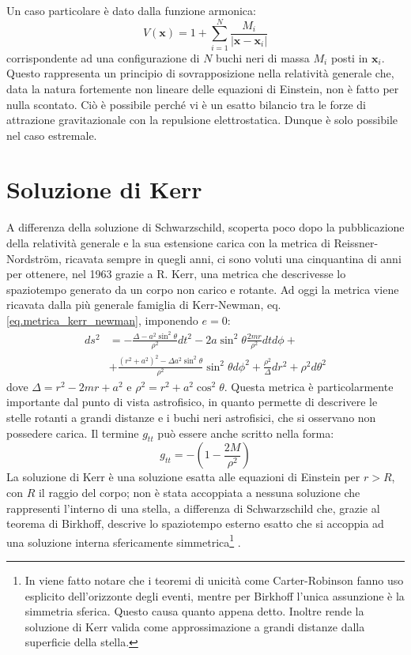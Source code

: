Un caso particolare è dato dalla funzione armonica:
\begin{equation*}
    V(\bm{x}) = 1 + \sum_{i=1}^N \frac{M_i}{|\bm{x} - \bm{x}_i|}
\end{equation*}
corrispondente ad una configurazione di $N$ buchi neri di massa $M_i$ posti in $\bm{x}_i$.
Questo rappresenta un principio di sovrapposizione nella relatività generale che, data la natura fortemente non lineare delle equazioni di Einstein, non è fatto per nulla scontato. Ciò è possibile perché vi è un esatto bilancio tra le forze di attrazione gravitazionale con la repulsione elettrostatica. Dunque è solo possibile nel caso estremale.

\section{Soluzione di Kerr}
A differenza della soluzione di Schwarzschild, scoperta poco dopo la pubblicazione della relatività generale e la sua estensione carica con la metrica di Reissner-Nordstr\"om, ricavata sempre in quegli anni, ci sono voluti una cinquantina di anni per ottenere, nel 1963 grazie a R. Kerr, una metrica che descrivesse lo spaziotempo generato da un corpo non carico e rotante.
Ad oggi la metrica viene ricavata dalla più generale famiglia di Kerr-Newman, eq. \ref{eq.metrica_kerr_newman}, imponendo $e = 0$:
\begin{align}
ds^2 &= - \frac{\Delta - a^2\sin^2\theta}{\rho^2}dt^2 - 2a\sin^2\theta\frac{2mr}{\rho^2}dtd\phi + \nonumber \\
&+ \frac{(r^2 + a^2)^2- \Delta a^2\sin^2\theta}{\rho^2}\sin^2\theta d\phi^2 + \frac{\rho^2}{\Delta}dr^2 + \rho^2 d\theta^2
    \label{eq.metrica_kerr}
\end{align}
dove $\Delta = r^2 -2mr + a^2$ e $\rho^2 = r^2 + a^2\cos^2\theta$. Questa metrica è particolarmente importante dal punto di vista astrofisico, in quanto permette di descrivere le stelle rotanti a grandi distanze e i buchi neri astrofisici, che si osservano non possedere carica.  Il termine $g_{tt}$ può essere anche scritto nella forma:
\begin{equation*}
    g_{tt}= -\left( 1 - \frac{2M}{\rho^2}\right)
\end{equation*}
La soluzione di Kerr è una soluzione esatta alle equazioni di Einstein per $r > R$, con $R$ il raggio del corpo; non è stata accoppiata a nessuna soluzione che rappresenti l'interno di una stella, a differenza di Schwarzschild che, grazie al teorema di Birkhoff, descrive lo spaziotempo esterno esatto che si accoppia ad una soluzione interna sfericamente simmetrica\footnote{In \cite{tong} viene fatto notare che i teoremi di unicità come Carter-Robinson fanno uso esplicito dell'orizzonte degli eventi, mentre per Birkhoff l'unica assunzione è la simmetria sferica. Questo causa quanto appena detto. Inoltre rende la soluzione di Kerr valida come approssimazione a grandi distanze dalla superficie della stella.} .

